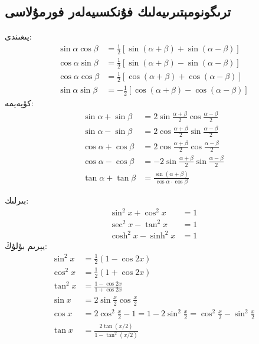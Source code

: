 \subsection{ترىگونومېتىرىيەلىك فۇنكسىيەلەر فورمۇلاسى}
يىغىندى:\\
\begin{align*}
    \sin \alpha \cos \beta & =\frac{1}{2}[\sin (\alpha+\beta)+\sin(\alpha-\beta)]  \\[7pt]
    \cos \alpha \sin \beta & =\frac{1}{2}[\sin (\alpha+\beta)-\sin(\alpha-\beta)]  \\[7pt]
    \cos \alpha \cos \beta & =\frac{1}{2}[\cos (\alpha+\beta)+\cos(\alpha-\beta)]  \\[7pt]
    \sin \alpha \sin \beta & =-\frac{1}{2}[\cos (\alpha+\beta)-\cos(\alpha-\beta)]
\end{align*}
كۆپەيمە:
\begin{align*}
    \sin\alpha+\sin\beta & =2\sin\frac{\alpha+\beta}{2}\cos\frac{\alpha-\beta}{2}  \\[7pt]
    \sin\alpha-\sin\beta & =2\cos\frac{\alpha+\beta}{2}\sin\frac{\alpha-\beta}{2}  \\[7pt]
    \cos\alpha+\cos\beta & =2\cos\frac{\alpha+\beta}{2}\cos\frac{\alpha-\beta}{2}  \\[7pt]
    \cos\alpha-\cos\beta & =-2\sin\frac{\alpha+\beta}{2}\sin\frac{\alpha-\beta}{2} \\[7pt]
    \tan\alpha+\tan\beta & =\frac{\sin (\alpha+\beta)}{\cos\alpha\cdot\cos \beta}
\end{align*}

بىرلىك:\\
\begin{align*}\label{gyhgs}
    \sin^2 x+\cos^2x  & =1 \\[7pt]
    \sec^2 x-\tan^2x  & =1 \\[7pt]
    \cosh^2x-\sinh^2x & =1
\end{align*}
يېرىم بۇلۇڭ:\\
\begin{align*}
    \sin^2x & =\frac{1}{2}(1-\cos 2x)                                                        \\[7pt]
    \cos^2x & =\frac{1}{2}(1+\cos 2x)                                                        \\[7pt]
    \tan^2x & =\frac{1-\cos 2x}{1+\cos 2x}                                                   \\[7pt]
    \sin x  & =2\sin\frac{x}{2}\cos\frac{x}{2}                                               \\[7pt]
    \cos x  & =2\cos^2\frac{x}{2}-1=1-2\sin^2\frac{x}{2}=\cos^2\frac{x}{2}-\sin^2\frac{x}{2} \\[7pt]
    \tan x  & =\frac{2\tan(x/2)}{1-\tan^2(x/2)}
\end{align*}

